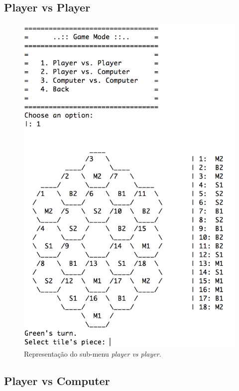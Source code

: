 \documentclass[a4paper]{article}
\begin{document}
\newpage

\subsection{Player vs Player}

\begin{figure}[!ht]
	\begin{center}
	\includegraphics[scale=0.4]{img/player_vs_player.png}
	\caption{Representação do sub-menu \textit{player vs player}.}
    \label{Fig:player_vs_player}
	\end{center}
\end{figure}

\subsection{Player vs Computer}
\end{document}
